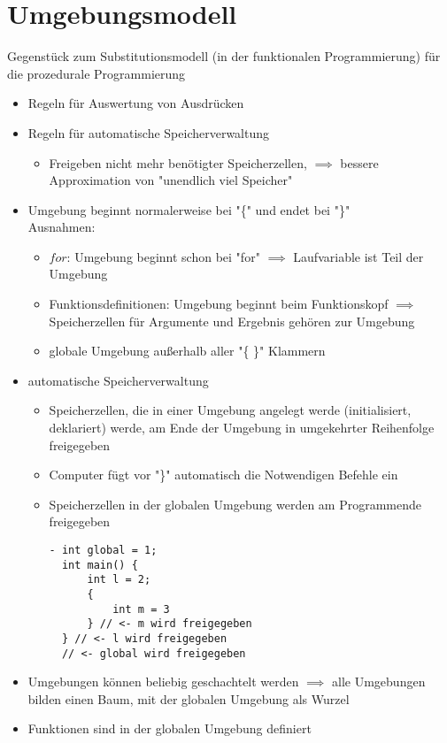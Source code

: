 \documentclass[a4paper]{scrartcl}
\theoremstyle{definition}
\theoremstyle{plain}
\theoremstyle{remark}
\theoremstyle{remark}
\begin{document}
\section{Umgebungsmodell}
\label{sec-9}
Gegenstück zum Substitutionsmodell (in der funktionalen Programmierung) für die prozedurale Programmierung
\begin{itemize}
\item Regeln für Auswertung von Ausdrücken
\item Regeln für automatische Speicherverwaltung
\begin{itemize}
\item Freigeben nicht mehr benötigter Speicherzellen, $\implies$ bessere Approximation von "unendlich viel Speicher"
\end{itemize}
\item Umgebung beginnt normalerweise bei "\{" und endet bei "\}" \\
        Ausnahmen:
\begin{itemize}
\item $for$: Umgebung beginnt schon bei "for" $\implies$ Laufvariable ist Teil der Umgebung
\item Funktionsdefinitionen: Umgebung beginnt beim Funktionskopf $\implies$ Speicherzellen für Argumente und Ergebnis gehören zur Umgebung
\item globale Umgebung außerhalb aller "\{ \}" Klammern
\end{itemize}
\item automatische Speicherverwaltung
\begin{itemize}
\item Speicherzellen, die in einer Umgebung angelegt werde (initialisiert, deklariert) werde, am Ende der Umgebung in umgekehrter Reihenfolge freigegeben
\item Computer fügt vor "\}" automatisch die Notwendigen Befehle ein
\item Speicherzellen in der globalen Umgebung werden am Programmende freigegeben
\begin{verbatim}
- int global = 1;
  int main() {
	  int l = 2;
	  {
		  int m = 3
	  } // <- m wird freigegeben
  } // <- l wird freigegeben
  // <- global wird freigegeben
\end{verbatim}
\end{itemize}
\item Umgebungen können beliebig geschachtelt werden $\implies$ alle Umgebungen bilden einen Baum, mit der globalen Umgebung als Wurzel
\item Funktionen sind in der globalen Umgebung definiert

\end{itemize}
\end{document}

